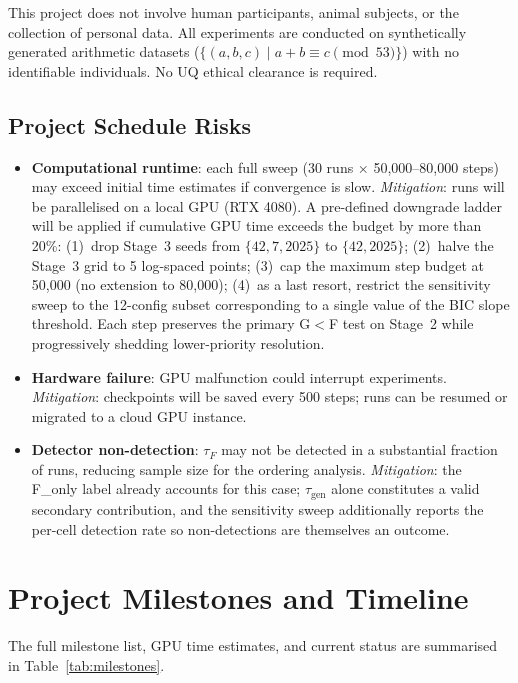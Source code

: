 \documentclass[12pt,openany,a4paper]{book}
\newcommand{\taug}{\tau_{\mathrm{gen}}}
\newcommand{\tauf}{\tau_{F}}
\begin{document}
This project does not involve human participants, animal subjects, or the collection of personal data.
All experiments are conducted on synthetically generated arithmetic
datasets ($\{(a,b,c) \mid a+b \equiv c \pmod{53}\}$) with no
identifiable individuals.
No UQ ethical clearance is required.

\subsection{Project Schedule Risks}

\begin{itemize}
  \item \textbf{Computational runtime}: each full sweep (30 runs
    $\times$ 50{,}000--80{,}000 steps) may exceed initial time
    estimates if convergence is slow.
    \textit{Mitigation}: runs will be parallelised on a local GPU
    (RTX 4080).
    A pre-defined downgrade ladder will be applied if cumulative GPU
    time exceeds the budget by more than 20\%:
    (1)~drop Stage~3 seeds from $\{42, 7, 2025\}$ to $\{42, 2025\}$;
    (2)~halve the Stage~3 grid to 5 log-spaced points;
    (3)~cap the maximum step budget at 50{,}000 (no extension to
    80{,}000); (4)~as a last resort, restrict the sensitivity sweep
    to the 12-config subset corresponding to a single value of the
    BIC slope threshold.
    Each step preserves the primary G$<$F test on Stage~2 while
    progressively shedding lower-priority resolution.
  \item \textbf{Hardware failure}: GPU malfunction could interrupt
    experiments.
    \textit{Mitigation}: checkpoints will be saved every 500 steps; runs
    can be resumed or migrated to a cloud GPU instance.
  \item \textbf{Detector non-detection}: $\tauf$ may not be detected
    in a substantial fraction of runs, reducing sample size for the
    ordering analysis.
    \textit{Mitigation}: the F\_only label already accounts for this
    case; $\taug$ alone constitutes a valid secondary contribution,
    and the sensitivity sweep additionally reports the per-cell
    detection rate so non-detections are themselves an outcome.
\end{itemize}

\section{Project Milestones and Timeline}

The full milestone list, GPU time estimates, and current status are
summarised in Table~\ref{tab:milestones}.
\end{document}
